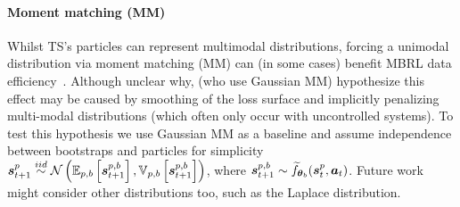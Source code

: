         

\vspace{-5pt}

   \paragraph{Moment matching (MM)}
Whilst TS's particles can represent multimodal distributions, forcing a unimodal distribution via moment matching (MM) can (in some cases) benefit MBRL data efficiency~\citep{Gal2016}. 
Although unclear why, \cite{Gal2016} (who use Gaussian MM) hypothesize this effect may be caused by smoothing of the loss surface and implicitly penalizing multi-modal distributions (which often only occur with uncontrolled systems). 
To test this hypothesis we use Gaussian MM as a baseline and assume independence between bootstraps and particles for simplicity
$\boldsymbol{s}_{t+1}^{p} \overset{iid}{\sim} \mathcal{N} \left( \mathbb{E}_{p,b}\left[\boldsymbol{s}_{t+1}^{p,b} \right], \mathbb{V}_{p,b}\left[\boldsymbol{s}_{t+1}^{p,b} \right] \right)$, where $\boldsymbol{s}_{t+1}^{p,b} \sim \widetilde{f}_{\boldsymbol{\theta}_b}(\boldsymbol{s}_{t}^{p}, \boldsymbol{a}_{t})$.
%
Future work might consider other distributions too, such as the Laplace distribution.

